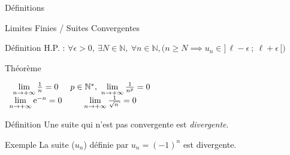 \documentclass{cours}
\begin{document}
\begin{Gpartie}{Définitions}
\begin{Spartie}{Limites Finies / Suites Convergentes}
\begin{SSpartie}{Définition}
                H.P. : $\forall\epsilon >0,~\exists N\in\mathbb{N},~\forall n\in\mathbb{N}, \Big(n\geq N\implies u_n\in\big]\,\ell-\epsilon~;~\ell+\epsilon\,\big[\Big)$
            \end{SSpartie}
            \begin{SSpartie}{Théorème} 
                \begin{center}$\begin{array}{cc}
                    \lim\limits_{n\to +\infty}\frac{1}{n}=0 & p\in\mathbb{N^*},\ \lim\limits_{n\to +\infty}\frac{1}{n^p}=0 \\
                    \lim\limits_{n\to +\infty}\me^{-n}=0 & \lim\limits_{n\to +\infty}\frac{1}{\sqrt{n}}=0
                \end{array}$\end{center}
            \end{SSpartie}
            \begin{SSpartie}{Définition} 
                Une suite qui n'est pas convergente est \emph{divergente}.
            \end{SSpartie}
            \begin{SSpartie}{Exemple} 
                La suite ($u_n$) définie par $u_n=(-1)^n$ est divergente.
            \end{SSpartie}
        \end{Spartie}
    \end{Gpartie}
    \pagebreak
\end{document}

